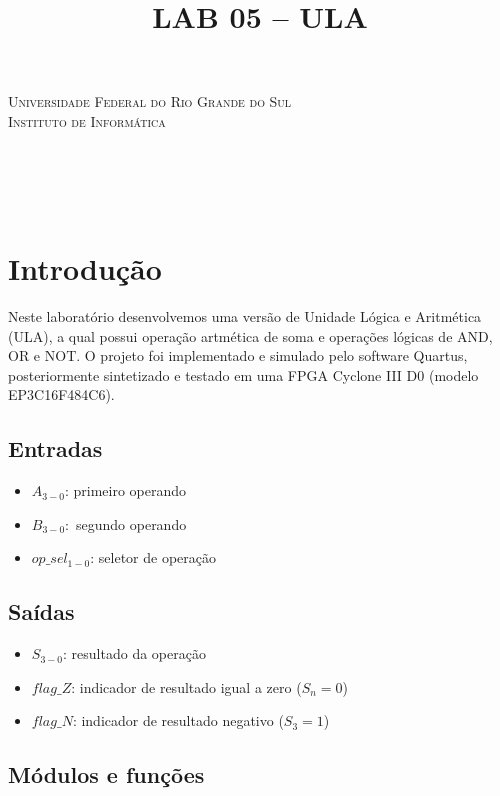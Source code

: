 \documentclass[12pt, fleqn]{article}
\title{LAB 05 – ULA}
\renewcommand{\maketitle}{
    \begin{titlepage}
        \begin{center}
            {\scshape Universidade Federal do Rio Grande do Sul\\Instituto de Informática} \\
            \vspace*{\fill}
            {\large \thecourse} \\[16pt]
            {\Huge \thetitle} \\[36pt]
            \theauthors \\
            \vspace*{\fill}
            \theprofessor \\[2pt]
            \thesemester
        \end{center}
    \end{titlepage}
}
\begin{document}
\maketitle

\section{Introdução}

Neste laboratório desenvolvemos uma versão de Unidade Lógica e Aritmética (ULA), a qual possui operação artmética de soma e operações lógicas de AND, OR e NOT. O projeto foi implementado e simulado pelo software Quartus, posteriormente sintetizado e testado em uma FPGA Cyclone III D0 (modelo EP3C16F484C6).

\subsection{Entradas}

\begin{itemize}
    \item $A_{3-0}$: primeiro operando
    \item $B_{3-0}:$ segundo operando
    \item $op\_sel_{1-0}$: seletor de operação
\end{itemize}

\subsection{Saídas}

\begin{itemize}
    \item $S_{3-0}$: resultado da operação
    \item $flag\_Z$: indicador de resultado igual a zero ($S_n = 0$)
    \item $flag\_N$: indicador de resultado negativo ($S_3 = 1$)
\end{itemize}

\subsection{Módulos e funções}
\end{document}
